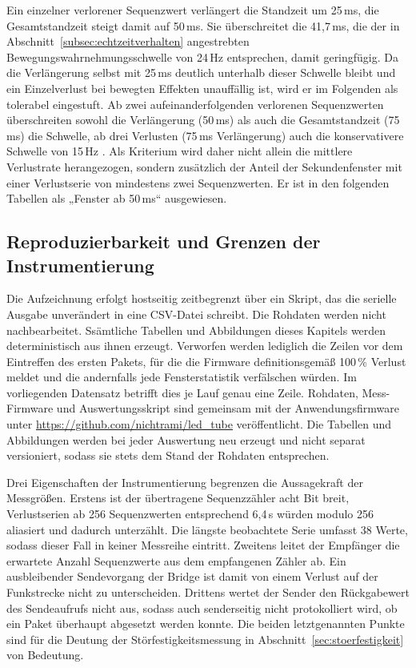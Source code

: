 Ein einzelner verlorener Sequenzwert verlängert die Standzeit um 25\,ms, die
Gesamtstandzeit steigt damit auf 50\,ms. Sie überschreitet die 41,7\,ms, die der
in Abschnitt~\ref{subsec:echtzeitverhalten} angestrebten
Bewegungswahrnehmungsschwelle von 24\,Hz entsprechen, damit geringfügig. Da die
Verlängerung selbst mit 25\,ms deutlich unterhalb dieser Schwelle bleibt und ein
Einzelverlust bei bewegten Effekten unauffällig ist, wird er im Folgenden als
tolerabel eingestuft. Ab zwei aufeinanderfolgenden verlorenen Sequenzwerten
überschreiten sowohl die Verlängerung (50\,ms) als auch die Gesamtstandzeit
(75\,ms) die Schwelle, ab drei Verlusten (75\,ms Verlängerung) auch die
konservativere Schwelle von 15\,Hz
\cite{fujii2018,ramunae2025}. Als Kriterium wird daher nicht allein die mittlere
Verlustrate herangezogen, sondern zusätzlich der Anteil der Sekundenfenster mit
einer Verlustserie von mindestens zwei Sequenzwerten. Er ist in den folgenden
Tabellen als „Fenster ab 50\,ms“ ausgewiesen.

\subsection{Reproduzierbarkeit und Grenzen der Instrumentierung}
\label{subsec:messgrenzen}

Die Aufzeichnung erfolgt hostseitig zeitbegrenzt über ein Skript, das die serielle
Ausgabe unverändert in eine CSV-Datei schreibt. Die Rohdaten werden nicht
nachbearbeitet. Ssämtliche Tabellen und Abbildungen dieses Kapitels werden
deterministisch aus ihnen erzeugt. Verworfen werden lediglich die Zeilen vor dem
Eintreffen des ersten Pakets, für die die Firmware definitionsgemäß 100\,\%
Verlust meldet und die andernfalls jede Fensterstatistik verfälschen würden. 
Im vorliegenden Datensatz betrifft dies je Lauf genau eine Zeile. Rohdaten,
Mess-Firmware und Auswertungsskript sind gemeinsam mit der Anwendungsfirmware
unter \url{https://github.com/nichtrami/led_tube} veröffentlicht. Die Tabellen
und Abbildungen werden bei jeder Auswertung neu erzeugt und nicht separat
versioniert, sodass sie stets dem Stand der Rohdaten entsprechen.

Drei Eigenschaften der Instrumentierung begrenzen die Aussagekraft der
Messgrößen. Erstens ist der übertragene Sequenzzähler acht Bit breit,
Verlustserien ab 256 Sequenzwerten entsprechend 6,4\,s würden modulo 256
aliasiert und dadurch unterzählt. Die längste beobachtete Serie umfasst 38 Werte,
sodass dieser Fall in keiner Messreihe eintritt. Zweitens leitet der Empfänger
die erwartete Anzahl Sequenzwerte aus dem empfangenen Zähler ab. Ein
ausbleibender Sendevorgang der Bridge ist damit von einem Verlust auf der
Funkstrecke nicht zu unterscheiden. Drittens wertet der Sender den Rückgabewert
des Sendeaufrufs nicht aus, sodass auch senderseitig nicht protokolliert wird, ob
ein Paket überhaupt abgesetzt werden konnte. Die beiden letztgenannten Punkte
sind für die Deutung der Störfestigkeitsmessung in
Abschnitt~\ref{sec:stoerfestigkeit} von Bedeutung.

